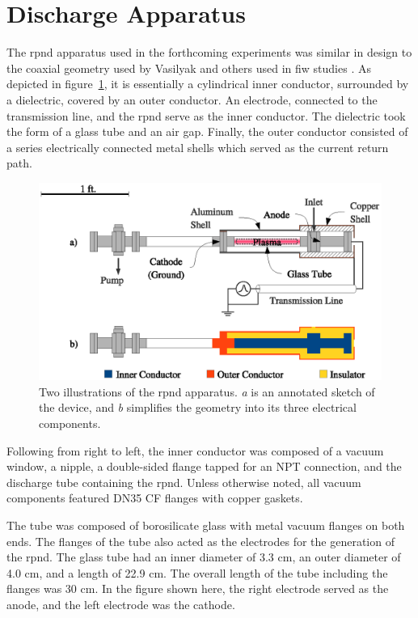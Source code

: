 \section{Discharge Apparatus}

The \acs{rpnd} apparatus used in the forthcoming experiments was similar in
design to the coaxial geometry used by Vasilyak and others used in \acs{fiw}
studies \cite{Vasilyak1994}. As depicted in figure~\ref{fig:appschem}, it is
essentially a cylindrical inner conductor, surrounded by a dielectric, covered
by an outer conductor. An electrode, connected to the transmission line, and the
\acs{rpnd} serve as the inner conductor. The dielectric took the form of a glass
tube and an air gap. Finally, the outer conductor consisted of a series
electrically connected metal shells which served as the current return path.
\begin{figure}
  \centering
  \includegraphics{./chapters/experiment/figures/appschem.eps}
  \caption{Two illustrations of the \acs{rpnd} apparatus. \emph{a} is
    an annotated sketch of the device, and \emph{b} simplifies the geometry
    into its three electrical components.}
  \label{fig:appschem}
\end{figure}
Following from right to left, the inner conductor was composed of a vacuum
window, a nipple, a double-sided flange tapped for an NPT connection, and the
discharge tube containing the \acs{rpnd}. Unless otherwise noted, all vacuum
components featured DN35 CF flanges with copper gaskets.

The tube was composed of borosilicate glass with metal vacuum flanges on both
ends. The flanges of the tube also acted as the electrodes for the generation of
the \acs{rpnd}. The glass tube had an inner diameter of 3.3 cm, an outer
diameter of 4.0 cm, and a length of 22.9 cm. The overall length of the tube
including the flanges was 30 cm. In the figure shown here, the right electrode
served as the anode, and the left electrode was the cathode.

